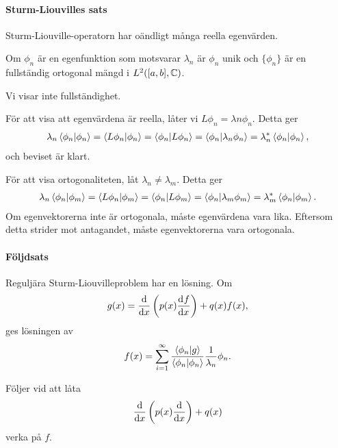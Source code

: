 \paragraph{Sturm-Liouvilles sats}
Sturm-Liouville-operatorn har oändligt många reella egenvärden.

Om $\phi_{n}$ är en egenfunktion som motsvarar $\lambda_{n}$ är $\phi_{n}$ unik och $\{\phi_{n}\}$ är en fullständig ortogonal mängd i $L^{2}([a, b], \mathbb{C})$.

\proof
Vi visar inte fullständighet.

För att visa att egenvärdena är reella, låter vi $L\phi_{n} = \lambda{n}\phi_{n}$. Detta ger
\begin{align*}
	\lambda_{n}\bra{\phi_{n}}\ket{\phi_{n}} = \bra{L\phi_{n}}\ket{\phi_{n}} = \bra{\phi_{n}}\ket{L\phi_{n}} = \bra{\phi_{n}}\ket{\lambda_{n}\phi_{n}} = \lambda_{n}^{*}\bra{\phi_{n}}\ket{\phi_{n}},
\end{align*}
och beviset är klart.

För att visa ortogonaliteten, låt $\lambda_{n} \neq \lambda_{m}$. Detta ger
\begin{align*}
	\lambda_{n}\bra{\phi_{n}}\ket{\phi_{m}} = \bra{L\phi_{n}}\ket{\phi_{m}} = \bra{\phi_{n}}\ket{L\phi_{m}} = \bra{\phi_{n}}\ket{\lambda_{m}\phi_{m}} = \lambda_{m}^{*}\bra{\phi_{n}}\ket{\phi_{m}}.
\end{align*}
Om egenvektorerna inte är ortogonala, måste egenvärdena vara lika. Eftersom detta strider mot antagandet, måste egenvektorerna vara ortogonala.

\paragraph{Följdsats}
Reguljära Sturm-Liouvilleproblem har en lösning. Om
\begin{align*}
	g(x) = \dv{x}\left(p(x)\dv[]{f}{x} (x)\right) + q(x)f(x),
\end{align*}
ges lösningen av
\begin{align*}
	f(x) = \sum\limits_{i = 1}^{\infty}\frac{\bra{\phi_{n}}\ket{g}}{\bra{\phi_{n}}\ket{\phi_{n}}}\frac{1}{\lambda_{n}}\phi_{n}.
\end{align*}

\proof
Följer vid att låta
\begin{align*}
	\dv{x}\left(p(x)\dv{x}\right) + q(x)
\end{align*}
verka på $f$.